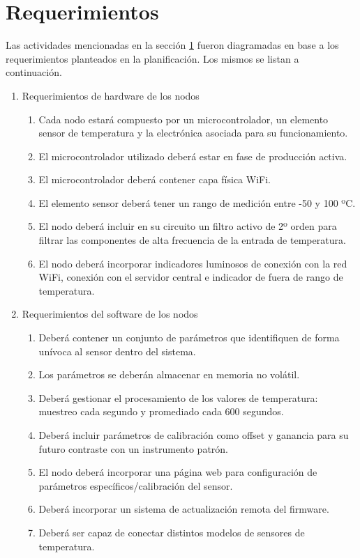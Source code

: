 \section{Requerimientos}
\label{alcance}


Las actividades mencionadas en la sección \ref{alcance} fueron diagramadas en base a los requerimientos planteados en la planificación. Los mismos se listan a continuación.

\begin{enumerate}
\item Requerimientos de hardware de los nodos
	\begin{enumerate}
	\item Cada nodo estará compuesto por un microcontrolador, un elemento sensor de temperatura y la electrónica asociada para su funcionamiento.
	\item El microcontrolador utilizado deberá estar en fase de producción activa.
	\item El microcontrolador deberá contener capa física WiFi.	
	\item El elemento sensor deberá tener un rango de medición entre -50 y 100 ºC.
	\item El nodo deberá incluir en su circuito un filtro activo de 2º orden para filtrar las componentes de alta frecuencia de la entrada de temperatura.
	\item El nodo deberá incorporar indicadores luminosos de conexión con la red WiFi, conexión con el servidor central e indicador de fuera de rango de temperatura.	
	\end{enumerate}
	
\item Requerimientos del software de los nodos
	\begin{enumerate}
	\item Deberá contener un conjunto de parámetros que identifiquen de forma unívoca al sensor dentro del sistema.	
	\item Los parámetros se deberán almacenar en memoria no volátil.
	\item Deberá gestionar el procesamiento de los valores de temperatura: muestreo cada segundo y promediado cada 600 segundos.	
	\item Deberá incluir parámetros de calibración como offset y ganancia para su futuro contraste con un instrumento patrón.
	\item El nodo deberá incorporar una página web para configuración de parámetros específicos/calibración del sensor.
	\item Deberá incorporar un sistema de actualización remota del firmware.
    \item Deberá ser capaz de conectar distintos modelos de sensores de temperatura.
	\end{enumerate}	
	

\end{enumerate}
